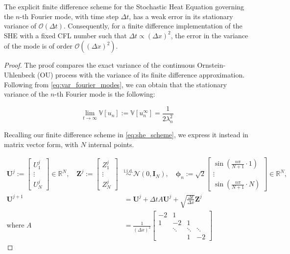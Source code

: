 \begin{proposition}
    \label{prop:weak_error_for_fourier_mode}
    The explicit finite difference scheme for the Stochastic Heat Equation
    governing the $n$-th Fourier mode, with time step $\Delta t$, has a weak error 
    in its stationary variance of 
    $\mathcal{O}(\Delta t)$. Consequently, for a finite difference 
    implementation of the SHE with a fixed CFL number such that 
    $\Delta t \propto (\Delta x)^2$, the error in the variance of the mode 
    is of order $\mathcal{O}((\Delta x)^2)$. 
\end{proposition}

\begin{proof}
The proof compares the exact variance of the
continuous Ornstein-Uhlenbeck 
(OU) process
with the variance of its finite difference approximation. 
Following from \eqref{eq:var_fourier_modes}, we can obtain that the 
stationary variance of the $n$-th Fourier mode is the following:

\begin{equation}\label{eq:stationary_variance}
    \lim_{t \to \infty} \mathbb{V}[u_n]
    := \mathbb{V}[u_n^{\infty}] = \frac{1}{2\lambda_n^2}
\end{equation}

Recalling our finite difference scheme in \eqref{eq:she_scheme},
we express it instead in matrix vector form, with $N$ 
internal points.

\begin{align}
    \mathbf{U}^j := 
    \begin{bmatrix}
        U_1^j \\
        \vdots \\
        U_N^j
    \end{bmatrix} 
    \in \mathbb{R}^N,
    \quad
    \mathbf{Z}^j := 
    \begin{bmatrix}
        Z_1^j \\
        \vdots \\
        Z_N^j
    \end{bmatrix}
    &\overset{\mathrm{i.i.d.}}{\sim} \mathcal{N}(0, \mathbf{I}_N),
    \quad
    \boldsymbol{\phi}_n := \sqrt{2}
    \begin{bmatrix}
        \sin\left( \frac{n \pi}{N+1} \cdot 1 \right) \\
        \vdots \\
        \sin\left( \frac{n \pi}{N+1} \cdot N \right)
    \end{bmatrix}
    \in \mathbb{R}^N, \\
    \mathbf{U}^{j+1} &= \mathbf{U}^j + \Delta t A \mathbf{U}^j
    + \sqrt{\frac{\Delta t}{\Delta x}} \mathbf{Z}^j \label{eq:scheme_matrix_vector}\\
    \text{where } A &= \frac{1}{(\Delta x)^2}
    \begin{bmatrix}
        -2 & 1 & & \\
        1 & -2 & 1  \\
        & \ddots & \ddots & \ddots \\
        & & 1 & -2
    \end{bmatrix}
\end{align}


\end{proof}

